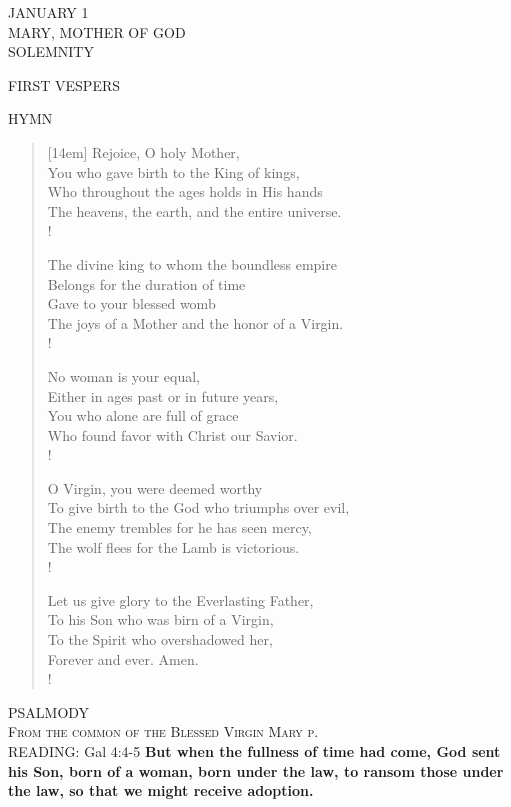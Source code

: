 \begin{center} \footnotesize JANUARY 1\\
\normalsize MARY, MOTHER OF GOD\\
\footnotesize SOLEMNITY
\end{center}

\begin{flushleft}\normalsize{\uppercase{FIRST VESPERS\\}}\end{flushleft}

\noindent\small{\uppercase{Hymn}}\normalsize
\begin{verse}[14em]
Rejoice, O holy Mother,\\
You who gave birth to the King of kings,\\
Who throughout the ages holds in His hands\\
The heavens, the earth, and the entire universe.\\!

The divine king to whom the boundless empire\\
Belongs for the duration of time\\
Gave to your blessed womb\\
The joys of a Mother and the honor of a Virgin.\\!

No woman is your equal,\\
Either in ages past or in future years,\\
You who alone are full of grace\\
Who found favor with Christ our Savior.\\!

O Virgin, you were deemed worthy\\
To give birth to the God who triumphs over evil,\\
The enemy trembles for he has seen mercy,\\
The wolf flees for the Lamb is victorious.\\!

Let us give glory to the Everlasting Father,\\
To his Son who was birn of a Virgin,\\
To the Spirit who overshadowed her,\\
Forever and ever. Amen.\\!
\end{verse}

\noindent\small{\uppercase{PSALMODY}\\}
\textsc{From the common of the Blessed Virgin Mary p. \pageref{common:bvm:firstVespers}}\vspace{0.5em}\\
\noindent\small{\uppercase{READING:}}    Gal 4:4-5 \textbf{   But when the fullness of time had come, God sent his Son, born of a woman, born under the law, to ransom those under the law, so that we might receive adoption.\\}

